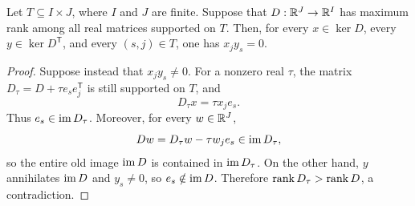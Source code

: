\begin{lemma}\label{lem:kernel-support}
Let $T\subseteq I\times J$, where $I$ and $J$ are finite.  Suppose that
$D:\mathbb R^J\to\mathbb R^I$ has maximum rank among all real matrices supported on $T$.
Then, for every $x\in\ker D$, every $y\in\ker D^{\mathsf T}$, and every
$(s,j)\in T$, one has $x_jy_s=0$.
\end{lemma}

\begin{proof}
Suppose instead that $x_jy_s\ne0$.  For a nonzero real $\tau$, the matrix
$D_\tau=D+\tau e_s e_j^{\mathsf T}$ is still supported on $T$, and
\[
 D_\tau x=\tau x_j e_s.
\]
Thus $e_s\in\operatorname{im} D_\tau$.  Moreover, for every $w\in\mathbb R^J$,
\[
 Dw=D_\tau w-\tau w_j e_s\in\operatorname{im} D_\tau,
\]
so the entire old image $\operatorname{im} D$ is contained in $\operatorname{im} D_\tau$.
On the other hand, $y$ annihilates $\operatorname{im} D$ and $y_s\ne0$, so
$e_s\notin\operatorname{im} D$.  Therefore $\operatorname{rank} D_\tau>\operatorname{rank} D$, a contradiction.
\end{proof}

